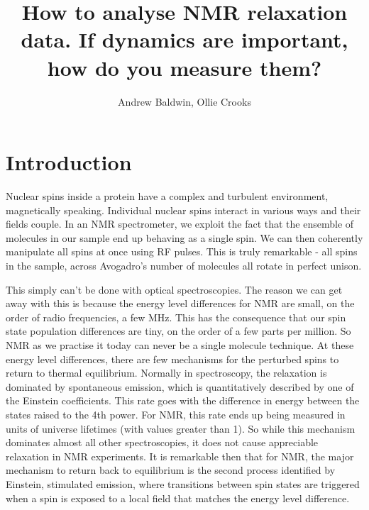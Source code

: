 \documentclass[showkeys,aps,prb,prepreint,amssymb, amsmath,nobibnotes]{article}
\title{How to analyse NMR relaxation data. If dynamics are important, how do you measure them?}
\author{Andrew Baldwin, Ollie Crooks}
\begin{document}
\maketitle


  \section{Introduction}

  Nuclear spins inside a protein have a complex and turbulent environment, magnetically speaking. Individual nuclear spins interact in various ways and their fields couple. In an NMR spectrometer, we exploit the fact that the ensemble of molecules in our sample end up behaving as a single spin. We can then coherently manipulate all spins at once using RF pulses. This is truly remarkable - all spins in the sample, across Avogadro's number of molecules all rotate in perfect unison.

  This simply can't be done with optical spectroscopies. The reason we can get away with this is because the energy level differences for NMR are small, on the order of radio frequencies, a few MHz. This has the consequence that our spin state population differences are tiny, on the order of a few parts per million. So NMR as we practise it today can never be a single molecule technique. At these energy level differences, there are few mechanisms for the perturbed spins to return to thermal equilibrium. Normally in spectroscopy, the relaxation is dominated by spontaneous emission, which is quantitatively described by one of the Einstein coefficients. This rate goes with the difference in energy between the states raised to the 4th power. For NMR, this rate ends up being measured in units of universe lifetimes (with values greater than 1). So while this mechanism dominates almost all other spectroscopies, it does not cause appreciable relaxation in NMR experiments. It is remarkable then that for NMR, the major mechanism to return back to equilibrium is the second process identified by Einstein, stimulated emission, where transitions between spin states are triggered when a spin is exposed to a local field that matches the energy level difference.
\end{document}
